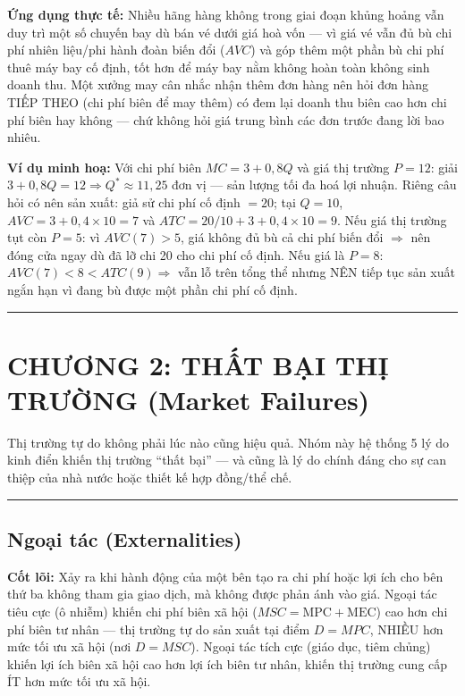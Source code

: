 \documentclass[
]{article}
\begin{document}
\textbf{Ứng dụng thực tế:} Nhiều hãng hàng không trong giai đoạn khủng
hoảng vẫn duy trì một số chuyến bay dù bán vé dưới giá hoà vốn --- vì
giá vé vẫn đủ bù chi phí nhiên liệu/phi hành đoàn biến đổi (\(AVC\)) và
góp thêm một phần bù chi phí thuê máy bay cố định, tốt hơn để máy bay
nằm không hoàn toàn không sinh doanh thu. Một xưởng may cân nhắc nhận
thêm đơn hàng nên hỏi đơn hàng TIẾP THEO (chi phí biên để may thêm) có
đem lại doanh thu biên cao hơn chi phí biên hay không --- chứ không hỏi
giá trung bình các đơn trước đang lời bao nhiêu.

\textbf{Ví dụ minh hoạ:} Với chi phí biên \(MC = 3 + 0{,}8Q\) và giá thị
trường \(P = 12\): giải
\(3 + 0{,}8Q = 12 \Rightarrow Q^* \approx 11{,}25\) đơn vị --- sản lượng
tối đa hoá lợi nhuận. Riêng câu hỏi có nên sản xuất: giả sử chi phí cố
định \(= 20\); tại \(Q = 10\), \(AVC = 3 + 0{,}4 \times 10 = 7\) và
\(ATC = 20/10 + 3 + 0{,}4 \times 10 = 9\). Nếu giá thị trường tụt còn
\(P = 5\): vì \(AVC (7) > 5\), giá không đủ bù cả chi phí biến đổi
\(\Rightarrow\) nên đóng cửa ngay dù đã lỡ chi 20 cho chi phí cố định.
Nếu giá là \(P = 8\): \(AVC (7) < 8 < ATC (9) \Rightarrow\) vẫn lỗ trên
tổng thể nhưng NÊN tiếp tục sản xuất ngắn hạn vì đang bù được một phần
chi phí cố định.

\begin{center}\rule{0.5\linewidth}{0.5pt}\end{center}

\section{CHƯƠNG 2: THẤT BẠI THỊ TRƯỜNG (Market
Failures)}\label{chux1b0ux1a1ng-2-thux1ea5t-bux1ea1i-thux1ecb-trux1b0ux1eddng-market-failures}

Thị trường tự do không phải lúc nào cũng hiệu quả. Nhóm này hệ thống 5
lý do kinh điển khiến thị trường ``thất bại'' --- và cũng là lý do chính
đáng cho sự can thiệp của nhà nước hoặc thiết kế hợp đồng/thể chế.

\begin{center}\rule{0.5\linewidth}{0.5pt}\end{center}

\subsection{Ngoại tác
(Externalities)}\label{ngoux1ea1i-tuxe1c-externalities}

\textbf{Cốt lõi:} Xảy ra khi hành động của một bên tạo ra chi phí hoặc
lợi ích cho bên thứ ba không tham gia giao dịch, mà không được phản ánh
vào giá. Ngoại tác tiêu cực (ô nhiễm) khiến chi phí biên xã hội
(\(MSC = \text{MPC} + \text{MEC}\)) cao hơn chi phí biên tư nhân --- thị
trường tự do sản xuất tại điểm \(D = MPC\), NHIỀU hơn mức tối ưu xã hội
(nơi \(D = MSC\)). Ngoại tác tích cực (giáo dục, tiêm chủng) khiến lợi
ích biên xã hội cao hơn lợi ích biên tư nhân, khiến thị trường cung cấp
ÍT hơn mức tối ưu xã hội.
\end{document}
